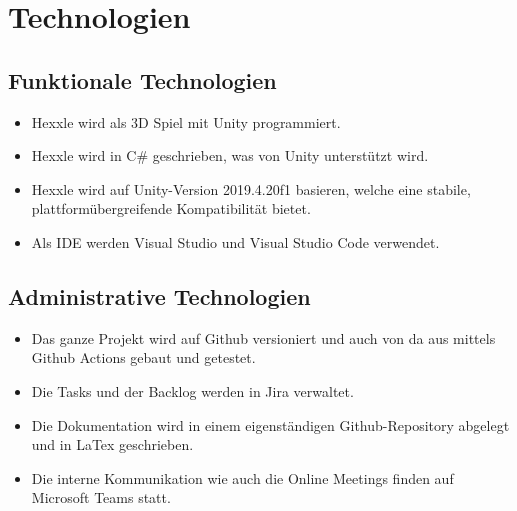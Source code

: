 \documentclass[../main.tex]{subfiles}
\begin{document}
	\section{Technologien}
	\subsection{Funktionale Technologien}
	\begin{itemize}
		\item Hexxle wird als 3D Spiel mit Unity programmiert.
		\item Hexxle wird in C\# geschrieben, was von Unity unterstützt wird.
		\item Hexxle wird auf Unity-Version 2019.4.20f1 basieren, welche eine stabile, plattformübergreifende Kompatibilität bietet.
		\item Als IDE  werden Visual Studio und Visual Studio Code verwendet.
	\end{itemize}
	\subsection{Administrative Technologien}
	\begin{itemize}
		\item Das ganze Projekt wird auf Github versioniert und auch von da aus mittels Github Actions gebaut und getestet.
		\item Die Tasks und der Backlog werden in Jira verwaltet.
		\item Die Dokumentation wird in einem eigenständigen Github-Repository abgelegt und in LaTex geschrieben.
		\item Die interne Kommunikation wie auch die Online Meetings finden auf Microsoft Teams statt.
	\end{itemize}
\end{document}
